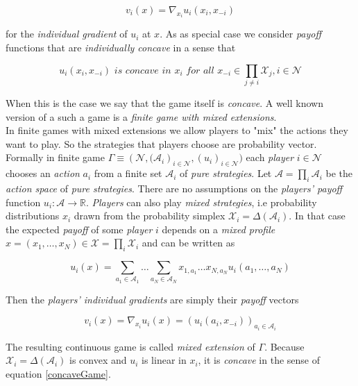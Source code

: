 \begin{equation*}
    v_i(x) = \nabla_{x_i}u_i(x_i,x_{-i})
\end{equation*}

for the \textit{individual gradient} of $u_i$ at $x$. As as special case we consider \textit{payoff} functions that are \textit{individually concave} in a sense that 

\begin{equation}\label{concaveGame}
    u_i(x_i,x_{-i}) \textit{ is concave in $x_i$ for all $x_{-i} \in \prod_{j\neq i}\mathcal{X}_j,i \in \mathcal{N}$}
\end{equation}

When this is the case we say that the game itself is \textit{concave}. A well known version of a such a game is a \textit{finite game with mixed extensions}. \\

In finite games with mixed extensions we allow players to "mix" the actions they want to play. So the strategies that players choose are probability vector. Formally in finite game $\Gamma \equiv (\mathcal{N}, {(\mathcal{A}_i})_{i\in\mathcal{N}},{(u_i)}_{i\in\mathcal{N}})$ each \textit{player} $i \in \mathcal{N}$ chooses an \textit{action} $a_i$ from a finite set $\mathcal{A}_i$ of \textit{pure strategies}. Let $\mathcal{A} = \prod_{i}\mathcal{A}_i$ be the \textit{action space} of \textit{pure strategies}. There are no assumptions on the \textit{players' payoff} function $u_i: \mathcal{A} \to \mathbb{R}$. \textit{Players} can also play \textit{mixed strategies}, i.e probability distributions $x_i$ drawn from the probability simplex $\mathcal{X}_i = \Delta(\mathcal{A}_i)$. In that case the expected \textit{payoff} of some \textit{player} $i$ depends on a \textit{mixed profile} $x = (x_1,\dots,x_N) \in \mathcal{X} = \prod_{i}\mathcal{X}_i$ and can be written as 

\begin{equation*}
    u_i(x) = \sum_{a_1\in\mathcal{A}_1}\dots\sum_{a_N\in\mathcal{A}_N} x_{1,a_1} \dots x_{N,a_N}u_i(a_1,\dots,a_N)
\end{equation*}

Then the \textit{players' individual gradients} are simply their \textit{payoff} vectors 

\begin{equation*}
    v_i(x) = \nabla_{x_i}u_i(x) = (u_i(a_i,x_{-i}))_{a_i\in\mathcal{A}_i}
\end{equation*}

The resulting continuous game is called \textit{mixed extension} of $\Gamma$. Because $\mathcal{X}_i = \Delta(\mathcal{A}_i)$ is convex and $u_i$ is linear in $x_i$, it is \textit{concave} in the sense of equation \ref{concaveGame}. \\

